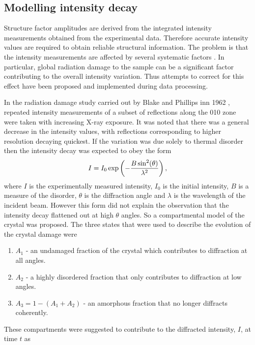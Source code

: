    \subsection{Modelling intensity decay}
    \label{sub:Modelling intensity decay}
        Structure factor amplitudes are derived from the integrated intensity measurements obtained from the experimental data.
        Therefore accurate intensity values are required to obtain reliable structural information.
		The problem is that the intensity measurements are affected by several systematic factors \cite{evans2005}.
		In particular, global radiation damage to the sample can be a significant factor contributing to the overall intensity variation.
		Thus attempts to correct for this effect have been proposed and implemented during data processing.

        In the radiation damage study carried out by Blake and Phillips inn 1962 \cite{blake1962}, repeated intensity measurements of a subset of reflections along the 010 zone were taken with increasing X-ray exposure.
        It was noted that there was a general decrease in the intensity values, with reflections corresponding to higher resolution decaying quickest.
        If the variation was due solely to thermal disorder then the intensity decay was expected to obey the form
        \begin{equation}
            I = I_0 \exp\left(-\frac{B \sin^2(\theta)}{\lambda^2} \right),
        \end{equation}
        where $I$ is the experimentally measured intensity, $I_0$ is the initial intensity, $B$ is a measure of the disorder, $\theta$ is the diffraction angle and $\lambda$ is the wavelength of the incident beam.
        However this form did not explain the observation that the intensity decay flattened out at high $\theta$ angles.
        So a compartmental model of the crystal was proposed. The three states that were used to describe the evolution of the crystal damage were
        \begin{enumerate}
            \item $A_1$ - an undamaged fraction of the crystal which contributes to diffraction at all angles.
            \item $A_2$ - a highly disordered fraction that only contributes to diffraction at low angles.
            \item $A_3 = 1 - (A_1 + A_2)$ - an amorphous fraction that no longer diffracts coherently.
        \end{enumerate}
        These compartments were suggested to contribute to the diffracted intensity, $I$, at time $t$ as
